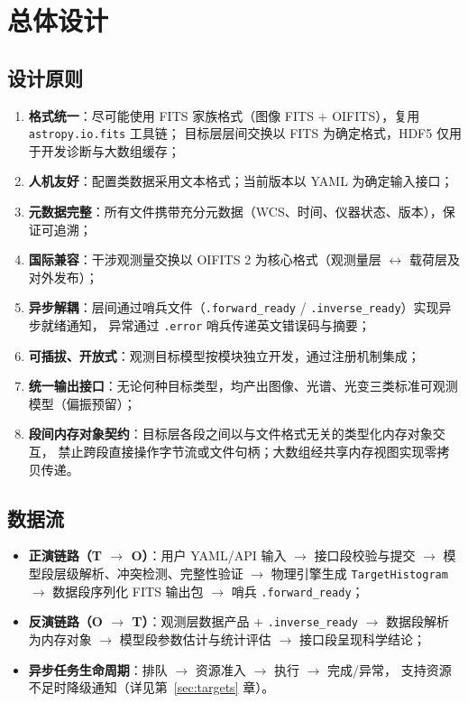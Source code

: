 \section{总体设计}

\subsection{设计原则}

\begin{enumerate}
  \item \textbf{格式统一}：尽可能使用 FITS 家族格式（图像 FITS + OIFITS），复用 \texttt{astropy.io.fits} 工具链；
        目标层层间交换以 FITS 为确定格式，HDF5 仅用于开发诊断与大数组缓存；
  \item \textbf{人机友好}：配置类数据采用文本格式；当前版本以 YAML 为确定输入接口；
  \item \textbf{元数据完整}：所有文件携带充分元数据（WCS、时间、仪器状态、版本），保证可追溯；
  \item \textbf{国际兼容}：干涉观测量交换以 OIFITS 2 为核心格式（观测量层 $\leftrightarrow$ 载荷层及对外发布）；
  \item \textbf{异步解耦}：层间通过哨兵文件（\texttt{.forward\_ready} / \texttt{.inverse\_ready}）实现异步就绪通知，
        异常通过 \texttt{.error} 哨兵传递英文错误码与摘要；
  \item \textbf{可插拔、开放式}：观测目标模型按模块独立开发，通过注册机制集成；
  \item \textbf{统一输出接口}：无论何种目标类型，均产出图像、光谱、光变三类标准可观测模型（偏振预留）；
  \item \textbf{段间内存对象契约}：目标层各段之间以与文件格式无关的类型化内存对象交互，
        禁止跨段直接操作字节流或文件句柄；大数组经共享内存视图实现零拷贝传递。
\end{enumerate}

\subsection{数据流}

\begin{itemize}
  \item \textbf{正演链路（T $\rightarrow$ O）}：用户 YAML/API 输入 $\rightarrow$ 接口段校验与提交 $\rightarrow$
        模型段层级解析、冲突检测、完整性验证 $\rightarrow$ 物理引擎生成 \texttt{TargetHistogram}
        $\rightarrow$ 数据段序列化 FITS 输出包 $\rightarrow$ 哨兵 \texttt{.forward\_ready}；
  \item \textbf{反演链路（O $\rightarrow$ T）}：观测层数据产品 + \texttt{.inverse\_ready} $\rightarrow$
        数据段解析为内存对象 $\rightarrow$ 模型段参数估计与统计评估 $\rightarrow$ 接口段呈现科学结论；
  \item \textbf{异步任务生命周期}：排队 $\rightarrow$ 资源准入 $\rightarrow$ 执行 $\rightarrow$ 完成/异常，
        支持资源不足时降级通知（详见第~\ref{sec:targets} 章）。
\end{itemize}

